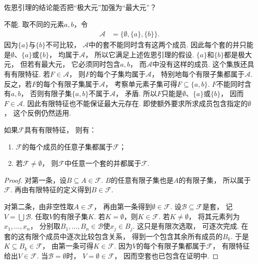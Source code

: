 \begin{example}
    佐恩引理的结论能否把“极大元”加强为“最大元”？
    \begin{solution}
        不能.
        取不同的元素\(a,b\)，令
        \begin{align*}
            \mathscr{A}&=\{\emptyset,\{a\},\{b\}\}.
        \end{align*}
        因为\(\{a\}\)与\(\{b\}\)不可比较，
        \(\mathscr{A}\)中的套不能同时含有这两个成员.
        因此每个套的并只能是\(\emptyset\)、\(\{a\}\)或\(\{b\}\)，
        均属于\(\mathscr{A}\)，
        所以它满足上述佐恩引理的假设.
        \(\{a\}\)和\(\{b\}\)都是极大元，
        但若有最大元，
        它必须同时包含\(a,b\)，
        而\(\mathscr{A}\)中没有这样的成员.
        这个集族还具有有限特征.
        若\(F\in\mathscr{A}\)，
        则\(F\)的每个子集均属于\(\mathscr{A}\)，
        特别地每个有限子集都属于\(\mathscr{A}\).
        反之，若\(F\)的每个有限子集属于\(\mathscr{A}\)，
        考察单元素子集可得\(F\subseteq\{a,b\}\).
        \(F\)不能同时含有\(a,b\)，
        否则有限子集\(\{a,b\}\)不属于\(\mathscr{A}\)，
        矛盾.
        所以\(F\)只能是\(\emptyset\)、\(\{a\}\)或\(\{b\}\)，
        因而\(F\in\mathscr{A}\).
        因此有限特征也不能保证最大元存在.
        即使额外要求所求成员包含指定的\(\emptyset\)，
        这个反例仍然适用.
    \end{solution}
\end{example}

\begin{lemma}\label{lemma:无穷直积.有限特征封闭性}
    如果\(\mathscr{F}\)具有有限特征，
    则有：
    \begin{enumerate}
        \item \(\mathscr{F}\)的每个成员的任意子集都属于\(\mathscr{F}\)；
        \item 若\(\mathscr{F}\neq\emptyset\)，
        则\(\mathscr{F}\)中任意一个套的并都属于\(\mathscr{F}\).
    \end{enumerate}
    \begin{proof}
        对第一条，设\(B\subseteq A\in\mathscr{F}\).
        \(B\)的任意有限子集也是\(A\)的有限子集，
        所以属于\(\mathscr{F}\).
        再由有限特征的定义得到\(B\in\mathscr{F}\).

        对第二条，由非空性取\(A\in\mathscr{F}\)，
        再由第一条得到\(\emptyset\in\mathscr{F}\).
        设\(\mathscr{B}\subseteq\mathscr{F}\)是套，
        记\(V=\bigcup\mathscr{B}\).
        任取\(V\)的有限子集\(K\).
        若\(K=\emptyset\)，则\(K\in\mathscr{F}\).
        若\(K\neq\emptyset\)，
        将其元素列为\(x_1,\dotsc,x_n\)，
        分别取\(B_1,\dotsc,B_n\in\mathscr{B}\)使\(x_j\in B_j\).
        这只是有限次选取，
        可逐次完成.
        在套的这有限个成员中逐次比较包含关系，
        得到一个包含其余所有成员的\(B_k\).
        于是\(K\subseteq B_k\in\mathscr{F}\)，
        由第一条可得\(K\in\mathscr{F}\).
        因为\(V\)的每个有限子集都属于\(\mathscr{F}\)，
        有限特征给出\(V\in\mathscr{F}\).
        当\(\mathscr{B}=\emptyset\)时，
        \(V=\emptyset\in\mathscr{F}\)，
        因而空套也已包含在证明中.
    \end{proof}
\end{lemma}

